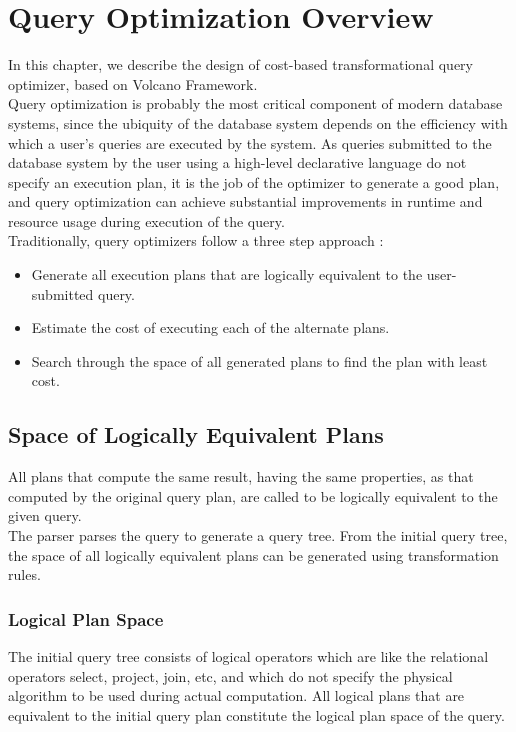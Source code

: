 \chapter{Query Optimization Overview}

In this chapter, we describe the design of cost-based transformational query optimizer, based on Volcano Framework. \\

Query optimization is probably the most critical component of modern database systems, since the ubiquity of the database system depends on the efficiency with which a user's queries are executed by the system. As queries submitted to the database system by the user using a high-level declarative language do not specify an execution plan, it is the job of the optimizer
to generate a good plan, and query optimization can achieve substantial improvements in runtime and resource usage during execution of the query. \\

Traditionally, query optimizers follow a three step approach \cite{roy2000efficient}:
\begin{itemize}
	\item  Generate all execution plans that are logically equivalent to the user-submitted query.
	\item Estimate the cost of executing each of the alternate plans.
	\item Search through the space of all generated plans to find the plan with least cost.
\end{itemize}

\section{Space of Logically Equivalent Plans}
All plans that compute the same result, having the same properties, as that computed by the original query plan, are called to be logically equivalent to the given query. \\

The parser parses the query to generate a query tree. From the initial query tree, the space of all logically equivalent plans can be generated using transformation rules.

\subsection{Logical Plan Space}
The initial query tree consists of logical operators which are like the relational operators select, project, join, etc, and which do not specify the physical algorithm to be used during actual computation. All logical plans that are equivalent to the initial query plan constitute the logical plan space of the query. \\

